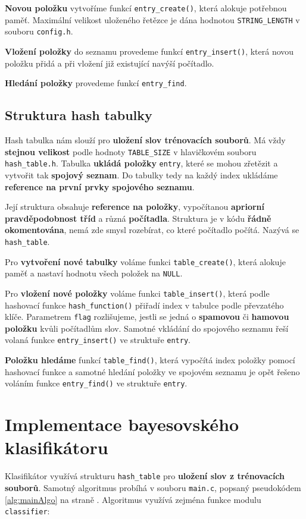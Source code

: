 \documentclass[12pt]{report}
\begin{document}
 		\textbf{Novou položku} vytvoříme funkcí \texttt{entry\_create()}, která alokuje potřebnou paměť. Maximální velikost uloženého řetězce je dána hodnotou \texttt{STRING\_LENGTH} v souboru \texttt{config.h}.
 		
 		\textbf{Vložení položky} do seznamu provedeme funkcí \texttt{entry\_insert()}, která novou položku přidá a při vložení již existující navýší počítadlo.
 		
 		\textbf{Hledání položky} provedeme funkcí \texttt{entry\_find}.
 		 	
 		\subsection{Struktura hash tabulky}
 		Hash tabulka nám slouží pro \textbf{uložení slov trénovacích souborů}. Má vždy \textbf{stejnou velikost} podle hodnoty \texttt{TABLE\_SIZE} v hlavičkovém souboru \texttt{hash\_table.h}. Tabulka \textbf{ukládá položky} \texttt{entry}, které se mohou zřetězit a vytvořit tak \textbf{spojový seznam}. Do tabulky tedy na každý index ukládáme \textbf{reference na první prvky spojového seznamu}. 
 		
 		Její struktura obsahuje \textbf{reference na položky}, vypočítanou \textbf{apriorní pravděpodobnost tříd} a různá \textbf{počítadla}. Struktura je v kódu \textbf{řádně okomentována}, nemá zde smysl rozebírat, co které počítadlo počítá. Nazývá se \texttt{hash\_table}.
 		
 		Pro \textbf{vytvoření nové tabulky} voláme funkci \texttt{table\_create()}, která alokuje paměť a nastaví hodnotu všech položek na \texttt{NULL}.
 		
 		Pro \textbf{vložení nové položky} voláme funkci \texttt{table\_insert()}, která podle hashovací funkce \texttt{hash\_function()} přiřadí index v tabulce podle převzatého klíče. Parametrem \texttt{flag} rozlišujeme, jestli se jedná o \textbf{spamovou} či \textbf{hamovou položku} kvůli počítadlům slov. Samotné vkládání do spojového seznamu řeší volaná funkce \texttt{entry\_insert()} ve struktuře \texttt{entry}.
 
 		\textbf{Položku hledáme} funkcí \texttt{table\_find()}, která vypočítá index položky pomocí hashovací funkce a samotné hledání položky ve spojovém seznamu je opět řešeno voláním funkce \texttt{entry\_find()} ve struktuře \texttt{entry}.
 	
 	\section{Implementace bayesovského klasifikátoru}
 	Klasifikátor využívá strukturu \texttt{hash\_table} pro \textbf{uložení slov z trénovacích souborů}. Samotný algoritmus probíhá v souboru \texttt{main.c}, popsaný pseudokódem \ref{alg:mainAlgo} na straně \pageref{alg:mainAlgo}. Algoritmus využívá zejména funkce modulu \texttt{classifier}:
 	 	
\end{document}
